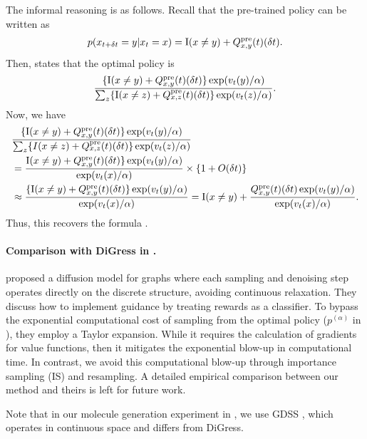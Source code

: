 {\begin{remark} \label{rem:equivalence}
The informal reasoning is as follows. Recall that the pre-trained policy can be written as
\begin{align*}
  p(x_{t+\delta t}=y|x_t=x) = \mathrm{I}(x\neq y) +  Q^{\mathrm{pre}}_{x,y}(t)(\delta t).  
\end{align*}
Then,  states that the optimal policy is 
\begin{align*}
 \frac{ \{ \mathrm{I}(x\neq y) + Q^{\mathrm{pre}}_{x,y}(t)(\delta t)\} \exp(v_{t}(y)/\alpha) }{ \sum_z \{ \mathrm{I}(x\neq z) + Q^{\mathrm{pre}}_{x,z}(t)(\delta t)\} \exp(v_{t}(z)/\alpha)  }. 
\end{align*}
Now, we have 
\begin{align*}
 & \frac{ \{ \mathrm{I}(x\neq y) + Q^{\mathrm{pre}}_{x,y}(t)(\delta t)\} \exp(v_{t}(y)/\alpha) }{ \sum_z \{ I(x\neq z) + Q^{\mathrm{pre}}_{x,z}(t)(\delta t)\} \exp(v_{t}(z)/\alpha)  } \\ 
 &= \frac{\mathrm{I}(x\neq y) + Q^{\mathrm{pre}}_{x,y}(t)(\delta t)\} \exp(v_{t}(y)/\alpha)}{\exp(v_{t}(x)/\alpha) }\times \left\{1+O(\delta t)  \right \} \\
 &\approx \frac{ \{ \mathrm{I}(x\neq y) + Q^{\mathrm{pre}}_{x,y}(t)(\delta t)\} \exp(v_{t}(y)/\alpha)}{\exp(v_{t}(x)/\alpha) }=  \mathrm{I}(x\neq y) +  \frac{  Q^{\mathrm{pre}}_{x,y}(t)(\delta t) \exp(v_{t}(y)/\alpha)}{\exp(v_{t}(x)/\alpha) }. 
\end{align*}
Thus, this recovers the formula . 
\end{remark}

\paragraph{Comparison with DiGress in \citet{vignac2022digress}.}


\citet{vignac2022digress} proposed a diffusion model for graphs where each sampling and denoising step operates directly on the discrete structure, avoiding continuous relaxation. They discuss how to implement guidance by treating rewards as a classifier. To bypass the exponential computational cost of sampling from the optimal policy ($p^{(\alpha)}$ in ), they employ a Taylor expansion. While it requires the calculation of gradients for value functions, then it mitigates the exponential blow-up in computational time. In contrast, we avoid this computational blow-up through importance sampling (IS) and resampling. A detailed empirical comparison between our method and theirs is left for future work.

\begin{remark}
Note that in our molecule generation experiment in , we use GDSS \citep{jo2022score}, which operates in continuous space and differs from DiGress.
\end{remark}
} 


